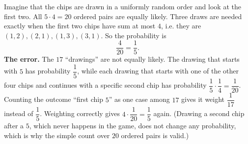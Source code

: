 Imagine that the chips are drawn in a uniformly random order and look at the first two. All $5\cdot4=20$ ordered pairs are equally likely. Three draws are needed exactly when the first two chips have sum at most $4$, i.e. they are $(1,2),(2,1),(1,3),(3,1)$. So the probability is
\[
\dfrac{4}{20}=\boxed{\dfrac{1}{5}}.
\]
\textbf{The error.} The $17$ ``drawings'' are not equally likely. The drawing that starts with $5$ has probability $\dfrac{1}{5}$, while each drawing that starts with one of the other four chips and continues with a specific second chip has probability $\dfrac{1}{5}\cdot\dfrac{1}{4}=\dfrac{1}{20}$. Counting the outcome ``first chip $5$'' as one case among $17$ gives it weight $\dfrac{1}{17}$ instead of $\dfrac{1}{5}$. Weighting correctly gives $4\cdot\dfrac{1}{20}=\dfrac{1}{5}$ again. (Drawing a second chip after a $5$, which never happens in the game, does not change any probability, which is why the simple count over $20$ ordered pairs is valid.)

